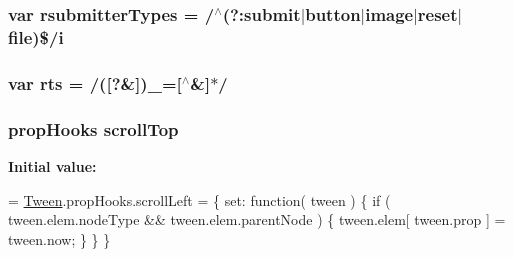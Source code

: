\subsubsection[{rsubmitter\+Types}]{\setlength{\rightskip}{0pt plus 5cm}var rsubmitter\+Types = /$^\wedge$(?\+:{\bf submit}$\vert${\bf button}$\vert$image$\vert$reset$\vert$file)\$/{\bf i}}\label{packages_2j_query_81_810_82_2_content_2_scripts_2jquery-1_810_82_8js_a0e9cd4ca08945afe827846f34a36c74a}
\hypertarget{packages_2j_query_81_810_82_2_content_2_scripts_2jquery-1_810_82_8js_a38ff30904f54277281a13514d7aea00d}{}
\subsubsection[{rts}]{\setlength{\rightskip}{0pt plus 5cm}var rts = /(\mbox{[}?\&\mbox{]})\+\_\+=\mbox{[}$^\wedge$\&\mbox{]}$\ast$/}\label{packages_2j_query_81_810_82_2_content_2_scripts_2jquery-1_810_82_8js_a38ff30904f54277281a13514d7aea00d}
\hypertarget{packages_2j_query_81_810_82_2_content_2_scripts_2jquery-1_810_82_8js_a57beb1f611d6c8b84919b0f7d9e0e890}{}
\subsubsection[{scroll\+Top}]{ {\bf prop\+Hooks} scroll\+Top}\label{packages_2j_query_81_810_82_2_content_2_scripts_2jquery-1_810_82_8js_a57beb1f611d6c8b84919b0f7d9e0e890}
{\bfseries Initial value\+:}
\begin{DoxyCode}
= \hyperlink{_bibabook_2_scripts_2jquery-1_810_82_8js_a91e55267cc469e865a6a7c6cfc51c7b1}{Tween}.propHooks.scrollLeft = \{
    set: \textcolor{keyword}{function}( tween ) \{
        \textcolor{keywordflow}{if} ( tween.elem.nodeType && tween.elem.parentNode ) \{
            tween.elem[ tween.prop ] = tween.now;
        \}
    \}
\}
\end{DoxyCode}
\hypertarget{packages_2j_query_81_810_82_2_content_2_scripts_2jquery-1_810_82_8js_afa6806c6ee5e63d5177f1dcc082ba6bc}{}
